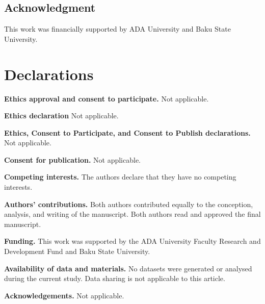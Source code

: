 \documentclass[pdflatex,sn-mathphys-num]{sn-jnl}%
\theoremstyle{thmstyleone}%
\theoremstyle{thmstyletwo}%
\theoremstyle{thmstylethree}%
\theoremstyle{definition}
\theoremstyle{remark}
\numberwithin{equation}{section}
\begin{document}
\subsection*{Acknowledgment}
This work was financially supported by ADA University and Baku State University.

\section*{Declarations}

\noindent\textbf{Ethics approval and consent to participate.}
Not applicable.

\noindent\textbf{Ethics declaration} Not applicable.

\noindent\textbf{Ethics, Consent to Participate, and Consent to Publish declarations.} Not applicable.

\noindent\textbf{Consent for publication.}
Not applicable.

\noindent\textbf{Competing interests.}
The authors declare that they have no competing interests.

\noindent\textbf{Authors' contributions.}
Both authors contributed equally to the conception, analysis, and writing of the manuscript. Both authors read and approved the final manuscript.

\noindent\textbf{Funding.}
This work was supported by the ADA University Faculty Research and Development Fund and Baku State University.

\noindent\textbf{Availability of data and materials.}
No datasets were generated or analysed during the current study. Data sharing is not applicable to this article.

\noindent\textbf{Acknowledgements.}
Not applicable.
\end{document}
